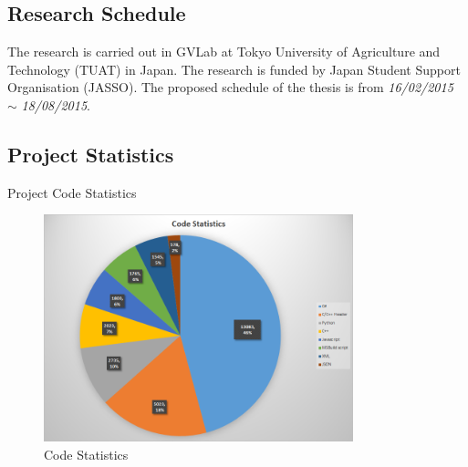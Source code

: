 \subsection*{Research Schedule}
	The research is carried out in GVLab at Tokyo University of Agriculture and Technology (TUAT) in Japan. The research is funded by Japan Student Support Organisation (JASSO). The proposed schedule of the thesis is from \emph{16/02/2015} $\sim$ \emph{18/08/2015}.
	
\subsection{Project Statistics}

\begin{table}[h!]
  \begin{center}
    \caption{Project Code Statistics}
    \label{table:code_stats}
  \end{center}
\end{table}

\begin{figure}
\centering
\includegraphics[width=0.8\textwidth]{assets/code_statistics.png}
\caption{Code Statistics}
\label{fig:code_stats}
\end{figure}  

